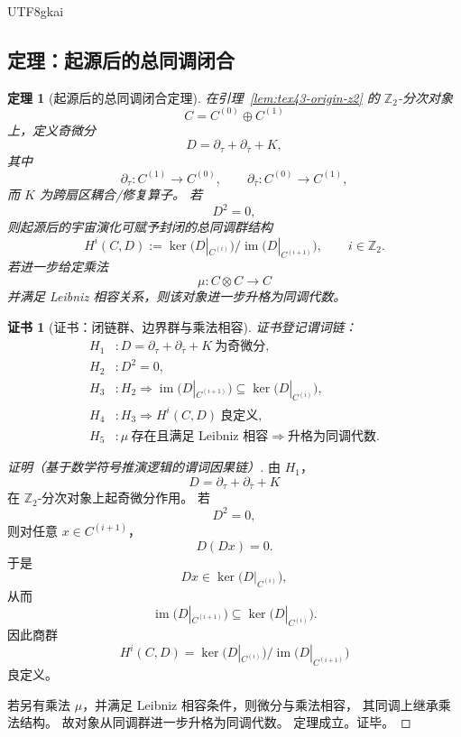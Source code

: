 \documentclass[12pt]{article}
\newtheorem{theorem}{定理}[section]
\newtheorem{Certificate}{证书}[section]
\newcommand{\Ztwo}{\mathbb{Z}_2}
\newcommand{\Img}{\operatorname{im}}
\newcommand{\Ker}{\operatorname{ker}}
\begin{document}
\begin{CJK*}{UTF8}{gkai}
\subsection{定理：起源后的总同调闭合}
\label{subsec:tex43-ch4-theorem-homology}

\begin{theorem}[起源后的总同调闭合定理]
\label{thm:tex43-origin-total-homology}
在引理~\ref{lem:tex43-origin-z2} 的 \(\Ztwo\)-分次对象
\[
  C=C^{(0)}\oplus C^{(1)}
\]
上，定义奇微分
\[
  D=\partial_\tau+\partial_{\bar\tau}+K,
\]
其中
\[
  \partial_\tau:C^{(1)}\to C^{(0)},
  \qquad
  \partial_{\bar\tau}:C^{(0)}\to C^{(1)},
\]
而 $K$ 为跨扇区耦合/修复算子。
若
\[
  D^2=0,
\]
则起源后的宇宙演化可赋予封闭的总同调群结构
\[
  H^i(C,D):=\Ker\!\bigl(D|_{C^{(i)}}\bigr)\Big/\Img\!\bigl(D|_{C^{(i+1)}}\bigr),
  \qquad
  i\in\Ztwo.
\]
若进一步给定乘法
\[
  \mu:C\otimes C\to C
\]
并满足 Leibniz 相容关系，则该对象进一步升格为同调代数。
\end{theorem}

\begin{Certificate}[证书：闭链群、边界群与乘法相容]
\label{cert:tex43-origin-total-homology}
证书登记谓词链：
\[
\begin{aligned}
  H_1 &: D=\partial_\tau+\partial_{\bar\tau}+K\ \text{为奇微分},\\
  H_2 &: D^2=0,\\
  H_3 &: H_2 \Rightarrow \Img\!\bigl(D|_{C^{(i+1)}}\bigr)\subseteq \Ker\!\bigl(D|_{C^{(i)}}\bigr),\\
  H_4 &: H_3 \Rightarrow H^i(C,D)\ \text{良定义},\\
  H_5 &: \mu\ \text{存在且满足 Leibniz 相容} \Rightarrow \text{升格为同调代数}.
\end{aligned}
\]
\end{Certificate}

\begin{proof}[证明（基于数学符号推演逻辑的谓词因果链）]
由 $H_1$，
\[
  D
  =
  \partial_\tau+\partial_{\bar\tau}+K
\]
在 \(\Ztwo\)-分次对象上起奇微分作用。
若
\[
  D^2=0,
\]
则对任意 $x\in C^{(i+1)}$，
\[
  D(Dx)=0.
\]
于是
\[
  Dx\in \Ker\!\bigl(D|_{C^{(i)}}\bigr),
\]
从而
\[
  \Img\!\bigl(D|_{C^{(i+1)}}\bigr)\subseteq \Ker\!\bigl(D|_{C^{(i)}}\bigr).
\]
因此商群
\[
  H^i(C,D)=\Ker\!\bigl(D|_{C^{(i)}}\bigr)\Big/\Img\!\bigl(D|_{C^{(i+1)}}\bigr)
\]
良定义。

若另有乘法 $\mu$，并满足 Leibniz 相容条件，则微分与乘法相容，
其同调上继承乘法结构。
故对象从同调群进一步升格为同调代数。
定理成立。证毕。
\end{proof}


\end{CJK*}
\end{document}
